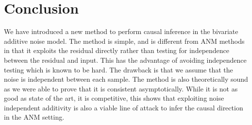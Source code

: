 \chapter{Conclusion}

We have introduced a new method to perform causal inference in the bivariate additive 
noise model. The method is simple, and is different from ANM methods in that it 
exploits the residual directly rather than testing for independence between 
the residual and input. This has the advantage of avoiding independence testing 
which is known to be hard. The drawback is that we assume that the noise is independent 
between each sample. The method is also theoretically sound as we were able to prove that 
it is consistent asymptotically. While it is not as good as state of the art, it is
competitive, this shows that exploiting noise independent additivity is also a viable 
line of attack to infer the causal direction in the ANM setting. 












